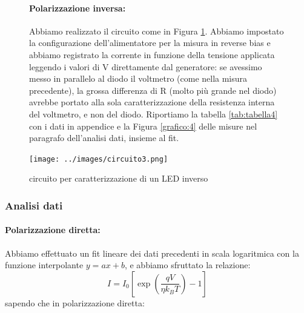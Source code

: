 \documentclass{article}
\begin{document}
\begin{figure}[h]
    \begin{minipage}{0.5\textwidth} %
        \paragraph{Polarizzazione inversa:}
        Abbiamo realizzato il circuito come in Figura \ref{circuito:3}. Abbiamo impostato la configurazione dell'alimentatore per la misura in reverse bias e abbiamo registrato la corrente in funzione della tensione applicata leggendo i valori di V direttamente dal generatore: 
        \newline
        se avessimo messo in parallelo al diodo il voltmetro (come nella misura precedente), la grossa differenza di R (molto più grande nel diodo) avrebbe portato alla sola caratterizzazione della resistenza interna del voltmetro, e non del diodo.
        \newline
        \newline
        Riportiamo la tabella \ref{tab:tabella4} con i dati in appendice e la Figura \ref{grafico:4} delle misure nel paragrafo dell'analisi dati, insieme al fit.
    \end{minipage}
    \hfill %
    \begin{minipage}{0.4\textwidth} %
        \centering
        \texttt{[image: ../images/circuito3.png]} %
        \caption{circuito per caratterizzazione di un LED inverso}
        \label{circuito:3}
    \end{minipage}
\end{figure}

\newpage

\subsubsection{Analisi dati}

\paragraph{Polarizzazione diretta:}

Abbiamo effettuato un fit lineare dei dati precedenti in scala logaritmica con la funzione interpolante $y=ax+b$, e abbiamo sfruttato la relazione: 
$$I=I_0 \left[\exp\left(\frac{qV}{\eta k_B T}\right)-1\right]$$ 
\newline
sapendo che in polarizzazione diretta:
\end{document}
